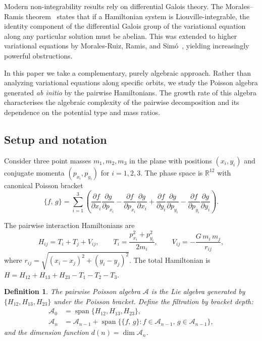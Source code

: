 \documentclass[11pt,a4paper]{article}
\newtheorem{definition}[theorem]{Definition}
\theoremstyle{remark}
\newcommand{\pb}[2]{\{#1,\,#2\}}
\newcommand{\R}{\mathbb{R}}
\newcommand{\cA}{\mathcal{A}}
\begin{document}
Modern non-integrability results rely on differential Galois
theory.  The Morales--Ramis theorem~\cite{morales-ramis-2001}
states that if a Hamiltonian system is Liouville-integrable, the
identity component of the differential Galois group of the
variational equation along any particular solution must be
abelian.  This was extended to higher variational equations by
Morales-Ruiz, Ramis, and Sim\'{o}~\cite{morales-ramis-simo-2007},
yielding increasingly powerful obstructions.

In this paper we take a complementary, purely algebraic approach.
Rather than analyzing variational equations along specific
orbits, we study the Poisson algebra generated \emph{ab initio}
by the pairwise Hamiltonians.  The growth rate of this algebra
characterises the algebraic complexity of the pairwise
decomposition and its dependence on the potential type and mass
ratios.

\subsection{Setup and notation}

Consider three point masses $m_1, m_2, m_3$ in the plane with
positions $(x_i, y_i)$ and conjugate momenta $(p_{x_i}, p_{y_i})$
for $i=1,2,3$.  The phase space is $\R^{12}$ with canonical
Poisson bracket
\[
  \pb{f}{g} = \sum_{i=1}^{3}
    \left(
      \frac{\partial f}{\partial x_i}\frac{\partial g}{\partial p_{x_i}}
      - \frac{\partial f}{\partial p_{x_i}}\frac{\partial g}{\partial x_i}
      + \frac{\partial f}{\partial y_i}\frac{\partial g}{\partial p_{y_i}}
      - \frac{\partial f}{\partial p_{y_i}}\frac{\partial g}{\partial y_i}
    \right).
\]

The pairwise interaction Hamiltonians are
\[
  H_{ij} = T_i + T_j + V_{ij}, \qquad
  T_i = \frac{p_{x_i}^2 + p_{y_i}^2}{2m_i}, \qquad
  V_{ij} = -\frac{G\,m_i\,m_j}{r_{ij}},
\]
where $r_{ij} = \sqrt{(x_i-x_j)^2 + (y_i-y_j)^2}$.  The total
Hamiltonian is $H = H_{12} + H_{13} + H_{23} - T_1 - T_2 - T_3$.

\begin{definition}
The \emph{pairwise Poisson algebra} $\cA$ is the Lie algebra
generated by $\{H_{12}, H_{13}, H_{23}\}$ under the Poisson
bracket.  Define the filtration by bracket depth:
\begin{align*}
  \cA_0 &= \operatorname{span}\{H_{12}, H_{13}, H_{23}\}, \\
  \cA_n &= \cA_{n-1} + \operatorname{span}\{\pb{f}{g} : f \in \cA_{n-1},\, g \in \cA_{n-1}\},
\end{align*}
and the dimension function $d(n) = \dim \cA_n$.
\end{definition}
\end{document}
